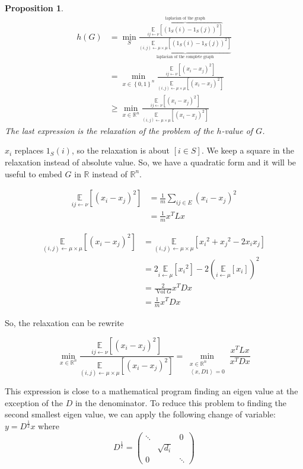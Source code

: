 \documentclass[12pt]{article}
\newtheorem{proposition}[lemma]{Proposition}
\newcommand{\EE}{\mathbb{E}}
\newcommand{\RR}{\mathbb{R}}
\newcommand{\set}[1]{\left\{ #1 \right\}}
\renewcommand{\angle}[1]{\left\langle #1 \right\rangle}
\newcommand{\la}{\leftarrow}
\newcommand{\esp}[2][]{\underset{#1}{\EE}\left[ #2 \right]}
\DeclareMathOperator{\vol}{Vol}
\begin{document}
\begin{proposition}
    \[
        \begin{aligned}
            h(G) &= \min\limits_{S} \frac{\overbrace{\esp[ij\la \nu]{(1_S(i)-1_S(j))^2}}^{\text{laplacian of the graph}}}{\underbrace{\esp[(i,j)\la\mu\times\mu]{(1_S(i)-1_S(j))^2}}_{\text{laplacian of the complete graph}}}\\
            &=\min\limits_{x\in\set{0,1}^n} \frac{\esp[ij\la\nu]{(x_i-x_j)^2}}{\esp[(i,j)\la\mu\times\mu]{(x_i-x_j)^2}}\\
            &\geqslant \min\limits_{x\in\RR^n} \frac{\esp[ij\la\nu]{(x_i-x_j)^{2}}}{\esp[(i,j)\la\mu\times\mu]{(x_i-x_j)^2}}
        \end{aligned}
    \]
    The last expression is the relaxation of the problem of the $h$-value of $G$.
\end{proposition}

$x_i$ replaces $1_S(i)$, so the relaxation is about $[i\in S]$. We keep a square in the relaxation instead of absolute value. So, we have a quadratic form and it will be useful to embed $G$ in $\RR$ instead of $\RR^n$.

\[
    \begin{aligned}
        \esp[ij\la\nu]{(x_i-x_j)^2} &= \frac{1}{m} \sum\limits_{ij\in E} (x_i-x_j)^2\\
        &= \frac{1}{m} x^T L x
    \end{aligned}
\]

\[
    \begin{aligned}
        \esp[(i,j) \la \mu\times\mu]{(x_i-x_j)^2} &= \esp[(i,j)\la\mu\times\mu]{{x_i}^2+{x_j}^2-2x_ix_j}\\
        &= 2\esp[i\la \mu]{{x_i}^2} - 2\left( \esp[i\la \mu]{x_i}\right)^2\\
        &= \frac{2}{\vol G} x^T D x\\
        &= \frac{1}{m} x^T D x
    \end{aligned}
\]

So, the relaxation can be rewrite

\[
    \min\limits_{x\in\RR^n} \frac{\esp[ij\la\nu]{(x_i-x_j)^{2}}}{\esp[(i,j)\la\mu\times\mu]{(x_i-x_j)^2}} = \min\limits_{\substack{x\in\RR^n\\\angle{x,D1}=0}} \frac{x^TLx}{x^TDx}
\]


This expression is close to a mathematical program finding an eigen value at the exception of the $D$ in the denominator. To reduce this problem to finding the second smallest eigen value, we can apply the following change of variable: $y = D^{\frac{1}{2}} x$ where 
\[
    D^{\frac{1}{2}} = \left(\begin{matrix}
         \ddots&&0 \\
         & \sqrt{d_i}\\
         0&&\ddots
    \end{matrix}\right)
\]
\end{document}
